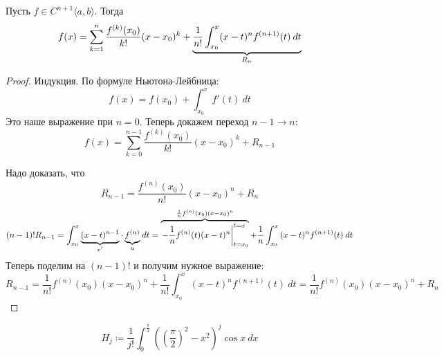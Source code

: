 \begin{theorem}
    Пусть $f \in C^{n + 1}\langle a, b \rangle$. Тогда
    \begin{equation*}
    f(x) =
    \sum_{k = 1}^{n} \frac{f^{(k)}(x_0)}{k!}(x - x_0)^k +
    \underbrace{\frac{1}{n!}\int_{x_0}^{x} (x - t)^n f^{(n + 1)}(t) \: dt}_{\mathclap{R_n}}
    \end{equation*}
\end{theorem}
\begin{proof}
    Индукция. По формуле Ньютона-Лейбница:
    \begin{equation*}
      f(x) = f(x_0) + \int_{x_0}^{x} f'(t) \: dt
    \end{equation*}
    Это наше выражение при $n = 0$. Теперь докажем переход $n - 1 \to n$:
    \begin{equation*}
      f(x) = \sum_{k = 0}^{n - 1} \frac{f^{(k)}(x_0)}{k!}(x - x_0)^{k} + R_{n - 1}
    \end{equation*}

    Надо доказать, что
    \begin{equation*}
      R_{n - 1} = \frac{f^{(n)}(x_0)}{n!}(x - x_0)^n + R_n
    \end{equation*}
    \begin{equation*}
      (n - 1)!R_{n - 1} =
      \int_{{x_0}}^{{x}} {\underbrace{(x - t)^{n - 1}}_{\mathclap{v'}}\cdot \underbrace{f^{(n)}}_{\mathclap{u}}} \: d{t} =
      \overbrace{\left.-\frac{1}{n}f^{(n)}(t)(x - t)^n\right|_{t = x_0}^{t = x}}^{\mathclap{\frac{1}{n}f^{(n)}(x_0)(x - x_0)^n}}
      + \frac{1}{n} \int_{{x_0}}^{{x}} {(x - t)^n f^{(n + 1)}(t)} \: d{t}
    \end{equation*}
    Теперь поделим на $(n - 1)!$ и получим нужное выражение:
    \begin{equation*}
      R_{n - 1} =
      \frac{1}{n!}f^{(n)}(x_0)(x - x_0)^{n} +
      \frac{1}{n!} \int_{{x_0}}^{{x}} {(x - t)^n f^{(n + 1)}(t)} \: d{t}
      =
      \frac{1}{n!}f^{(n)}(x_0)(x - x_0)^{n} +
      R_n
    \end{equation*}
\end{proof}

\begin{example}
  \begin{equation*}
    H_j \coloneqq \frac{1}{j!}\int_{0}^{\frac{\pi}{2}}\left((\frac{\pi}{2})^2 - x^2\right)^j \cos x \: dx
  \end{equation*}
\end{example}

